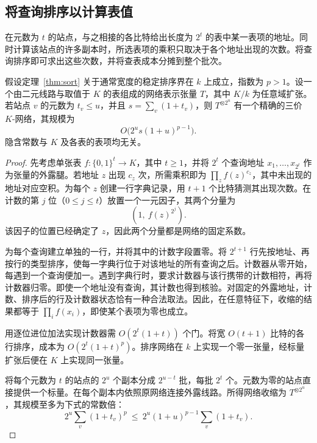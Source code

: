 \subsection{将查询排序以计算表值}

在元数为 $t$ 的站点，与之相接的各比特给出长度为 $2^t$ 的表中某一表项的地址。同时计算该站点的许多副本时，所选表项的乘积只取决于各个地址出现的次数。将查询排序即可求出这些次数，并将查表成本分摊到整个批次。

\begin{lemma}[批量查表]\label{lem:batch-table} 假设定理~\ref{thm:sort} 关于通常宽度的稳定排序界在 $k$ 上成立，指数为 $p>1$。设一个由二元线路与取值于 $K$ 的表组成的网络表示张量 $T$，其中 $K/k$ 为任意域扩张。若站点 $v$ 的元数为 $t_v\le u$，并且 $s=\sum_v(1+t_v)$，则 $T^{\otimes 2^u}$ 有一个精确的三价 $K$-网络，其规模为 \[
                  O\bigl(2^u s(1+u)^{p-1}\bigr).
\] 隐含常数与 $K$ 及各表的表项均无关。\end{lemma}

\begin{proof} 先考虑单张表 $f\colon\{0,1\}^t\to K$，其中 $t\ge1$，并将 $2^t$ 个查询地址 $x_1,\ldots,x_{2^t}$ 作为张量的外露腿。若地址 $z$ 出现 $c_z$ 次，所需乘积即为 $\prod_z f(z)^{c_z}$，其中未出现的地址对应空积。为每个 $z$ 创建一行字典记录，用 $t+1$ 个比特猜测其出现次数。在计数的第 $j$ 位（$0\le j\le t$）放置一个一元因子，其两个分量为 \[
                    (1,\ f(z)^{2^j}).
\] 该因子的位置已经确定了 $z$，因此两个分量都是网络的固定系数。

为每个查询建立单独的一行，并将其中的计数字段置零。将 $2^{t+1}$ 行先按地址、再按行的类型排序，使每一字典行位于对该地址的所有查询之后。计数器从零开始，每遇到一个查询便加一。遇到字典行时，要求计数器与该行携带的计数相符，再将计数器归零。即使一个地址没有查询，其计数也得到核验。对固定的外露地址，计数、排序后的行及计数器状态恰有一种合法取法。因此，在任意特征下，收缩的结果都等于 $\prod_i f(x_i)$，即使某个表项为零也成立。

用逐位进位加法实现计数器需 $O(2^t(1+t))$ 个门。将宽 $O(t+1)$ 比特的各行排序，成本为 $O(2^t(1+t)^p)$。排序网络在 $k$ 上实现一个零一张量，经标量扩张后便在 $K$ 上实现同一张量。

将每个元数为 $t$ 的站点的 $2^u$ 个副本分成 $2^{u-t}$ 批，每批 $2^t$ 个。元数为零的站点直接提供一个标量。在每个副本内依照原网络连接外露线路。所得网络收缩为 $T^{\otimes 2^u}$，其规模至多为下式的常数倍：\[
  2^u\sum_v(1+t_v)^p
       \ \le\ 2^u(1+u)^{p-1}\sum_v(1+t_v).
\] \end{proof}
